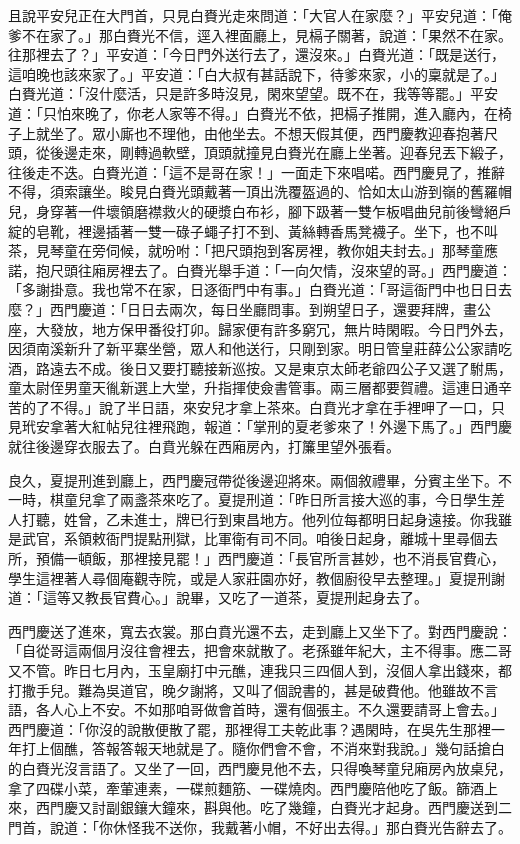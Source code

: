 且說平安兒正在大門首，只見白賚光走來問道：「大官人在家麼？」平安兒道：「俺爹不在家了。」那白賚光不信，逕入裡面廳上，見槅子關著，說道：「果然不在家。往那裡去了？」平安道：「今日門外送行去了，還沒來。」白賚光道：「既是送行，這咱晚也該來家了。」平安道：「白大叔有甚話說下，待爹來家，小的稟就是了。」白賚光道：「沒什麼活，只是許多時沒見，閑來望望。既不在，我等等罷。」平安道：「只怕來晚了，你老人家等不得。」白賚光不依，把槅子推開，進入廳內，在椅子上就坐了。眾小廝也不理他，由他坐去。不想天假其便，西門慶教迎春抱著尺頭，從後邊走來，剛轉過軟壁，頂頭就撞見白賚光在廳上坐著。迎春兒丟下緞子，往後走不迭。白賚光道：「這不是哥在家！」一面走下來唱喏。西門慶見了，推辭不得，須索讓坐。睃見白賚光頭戴著一頂出洗覆盔過的、恰如太山游到嶺的舊羅帽兒，身穿著一件壞領磨襟救火的硬漿白布衫，腳下趿著一雙乍板唱曲兒前後彎絕戶綻的皂靴，裡邊插著一雙一碌子蠅子打不到、黃絲轉香馬凳襪子。坐下，也不叫茶，見琴童在旁伺候，就吩咐：「把尺頭抱到客房裡，教你姐夫封去。」那琴童應諾，抱尺頭往廂房裡去了。白賚光舉手道：「一向欠情，沒來望的哥。」西門慶道：「多謝掛意。我也常不在家，日逐衙門中有事。」白賚光道：「哥這衙門中也日日去麼？」西門慶道：「日日去兩次，每日坐廳問事。到朔望日子，還要拜牌，畫公座，大發放，地方保甲番役打卯。歸家便有許多窮冗，無片時閑暇。今日門外去，因須南溪新升了新平寨坐營，眾人和他送行，只剛到家。明日管皇莊薛公公家請吃酒，路遠去不成。後日又要打聽接新巡按。又是東京太師老爺四公子又選了駙馬，童太尉侄男童天㣧新選上大堂，升指揮使僉書管事。兩三層都要賀禮。這連日通辛苦的了不得。」說了半日語，來安兒才拿上茶來。白賁光才拿在手裡呷了一口，只見玳安拿著大紅帖兒往裡飛跑，報道：「掌刑的夏老爹來了！外邊下馬了。」西門慶就往後邊穿衣服去了。白賁光躲在西廂房內，打簾里望外張看。

良久，夏提刑進到廳上，西門慶冠帶從後邊迎將來。兩個敘禮畢，分賓主坐下。不一時，棋童兒拿了兩盞茶來吃了。夏提刑道：「昨日所言接大巡的事，今日學生差人打聽，姓曾，乙未進士，牌已行到東昌地方。他列位每都明日起身遠接。你我雖是武官，系領敕衙門提點刑獄，比軍衛有司不同。咱後日起身，離城十里尋個去所，預備一頓飯，那裡接見罷！」西門慶道：「長官所言甚妙，也不消長官費心，學生這裡著人尋個庵觀寺院，或是人家莊園亦好，教個廚役早去整理。」夏提刑謝道：「這等又教長官費心。」說畢，又吃了一道茶，夏提刑起身去了。

西門慶送了進來，寬去衣裳。那白賁光還不去，走到廳上又坐下了。對西門慶說：「自從哥這兩個月沒往會裡去，把會來就散了。老孫雖年紀大，主不得事。應二哥又不管。昨日七月內，玉皇廟打中元醮，連我只三四個人到，沒個人拿出錢來，都打撒手兒。難為吳道官，晚夕謝將，又叫了個說書的，甚是破費他。他雖故不言語，各人心上不安。不如那咱哥做會首時，還有個張主。不久還要請哥上會去。」西門慶道：「你沒的說散便散了罷，那裡得工夫乾此事？遇閑時，在吳先生那裡一年打上個醮，答報答報天地就是了。隨你們會不會，不消來對我說。」幾句話搶白的白賚光沒言語了。又坐了一回，西門慶見他不去，只得喚琴童兒廂房內放桌兒，拿了四碟小菜，牽葷連素，一碟煎麵筋、一碟燒肉。西門慶陪他吃了飯。篩酒上來，西門慶又討副銀鑲大鐘來，斟與他。吃了幾鐘，白賚光才起身。西門慶送到二門首，說道：「你休怪我不送你，我戴著小帽，不好出去得。」那白賚光告辭去了。

